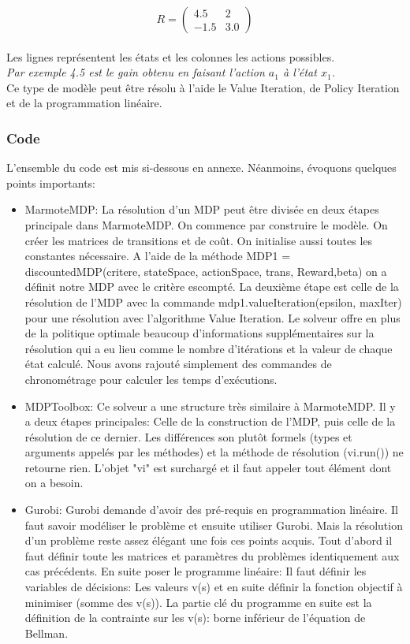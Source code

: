 \documentclass{article}
\begin{document}
 $$ R =\begin{pmatrix}
4.5 & 2 \\
-1.5 & 3.0
\end{pmatrix}$$ \\
Les lignes représentent les états et les colonnes les actions possibles. \\
\textit{Par exemple 4.5 est le gain obtenu en faisant l'action $a_1$ à l'état $x_1$.}
\\
Ce type de modèle peut être résolu à l'aide le Value Iteration, de Policy Iteration et de la programmation linéaire.

\subsubsection{Code}
L'ensemble du code est mis si-dessous en annexe. Néanmoins, évoquons quelques points importants:
\begin{itemize}
        \item MarmoteMDP: La résolution d'un MDP peut être divisée en deux étapes principale dans MarmoteMDP. On commence par construire le modèle. On créer les matrices de transitions et de coût. On initialise aussi toutes les constantes nécessaire. A l'aide de la méthode MDP1 = discountedMDP(critere, stateSpace, actionSpace, trans, Reward,beta) on a définit notre MDP avec le critère escompté. La deuxième étape est celle de la résolution de l'MDP avec la commande mdp1.valueIteration(epsilon, maxIter) pour une résolution avec l'algorithme Value Iteration. Le solveur offre en plus de la politique optimale beaucoup d'informations supplémentaires sur la résolution qui a eu lieu comme le nombre d'itérations et la valeur de chaque état calculé. Nous avons rajouté simplement des commandes de chronométrage pour calculer les temps d'exécutions.
        \item MDPToolbox: Ce solveur a une structure très  similaire à MarmoteMDP. Il y a deux étapes principales: Celle de la construction de l'MDP, puis celle de la résolution de ce dernier. Les différences son plutôt formels (types et arguments appelés par les méthodes) et la méthode de résolution (vi.run()) ne retourne rien. L'objet "vi" est surchargé et il faut appeler tout élément dont on a besoin.
        \item Gurobi: Gurobi demande d'avoir des pré-requis en programmation linéaire. Il faut savoir modéliser le problème et ensuite utiliser Gurobi. Mais la résolution d'un problème reste assez élégant une fois ces points acquis. Tout d'abord il faut définir toute les matrices et paramètres du problèmes identiquement aux cas précédents. En suite poser le programme linéaire: Il faut définir les variables de décisions: Les valeurs v(s) et en suite définir la fonction objectif à minimiser (somme des v(s)). La partie clé du programme en suite est la définition de la contrainte sur les v(s): borne inférieur de l'équation de Bellman.
\end{itemize}
\end{document}
